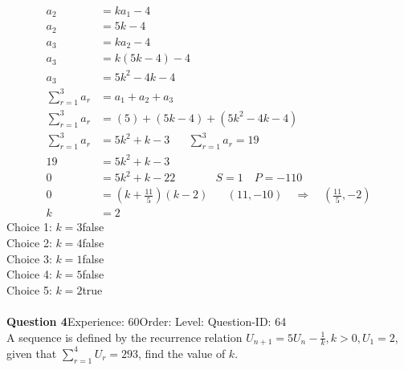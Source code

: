 \documentclass{article}
\begin{document}
\\[-35pt]\begin{align*}
a_2&=ka_1-4\\[2pt]
a_2&=5k-4\\[12pt]
a_3&=ka_2-4\\[2pt]
a_3&=k(5k-4)-4\\[2pt]
a_3&=5k^2-4k-4\\[12pt]
\displaystyle\sum_{r=1}^{3} a_r&=a_1+a_2+a_3\\[2pt]
\displaystyle\sum_{r=1}^{3} a_r&=(5)+(5k-4)+(5k^2-4k-4)\\[2pt]
\displaystyle\sum_{r=1}^{3} a_r&=5k^2+k-3\hspace{20pt}\displaystyle\sum_{r=1}^{3} a_r=19\\[2pt]
19&=5k^2+k-3\\[2pt]
0&=5k^2+k-22\hspace{43pt}S=1 \quad P=-110\\[2pt]
0&=\left(k+\displaystyle\frac{11}{5}\right)(k-2)\hspace{20pt}(11,-10)\quad \Rightarrow \quad \left(\displaystyle\frac{11}{5},-2\right)\\[2pt]
k&=2
\end{align*}
Choice 1: \hspace{20pt}$k=3$\hspace{20pt}false\\
Choice 2: \hspace{20pt}$k=4$\hspace{20pt}false\\
Choice 3: \hspace{20pt}$k=1$\hspace{20pt}false\\
Choice 4: \hspace{20pt}$k=5$\hspace{20pt}false\\
Choice 5: \hspace{20pt}$k=2$\hspace{20pt}true\\
\\[4pt]
\noindent\textbf{Question 4}\hspace{20pt}Experience: 60\hspace{20pt}Order: \hspace{20pt}Level: \hspace{20pt}Question-ID: 64\\[2pt]
A sequence is defined by the recurrence relation $U_{n+1}=5U_n-\displaystyle\frac{1}{k},  k>0, U_1=2$, given that $\displaystyle\sum_{r=1}^{4} U_r=293$, find the value of $k$.\\[4pt]
\end{document}
